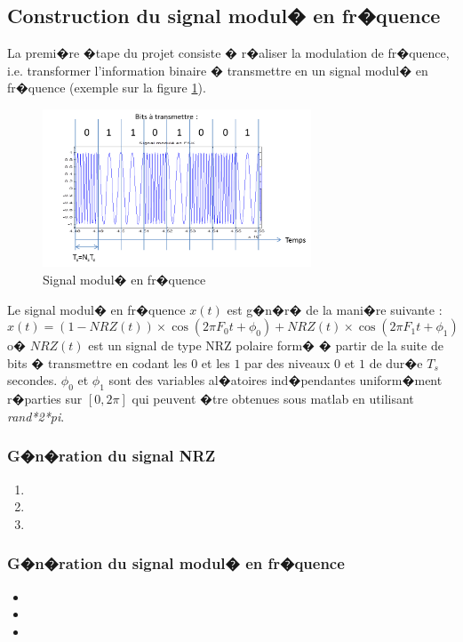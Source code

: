 \documentclass[frenchb]{article}
\begin{document}
    \subsection{Construction du signal modul� en fr�quence} \label{sec:signal}
    La premi�re �tape du projet consiste � r�aliser la modulation de fr�quence, i.e. transformer l'information binaire � transmettre en un signal modul� en fr�quence (exemple sur la figure \ref{fig : signalFSK}).
        \begin{figure}[ht!]
            \centering
            \includegraphics[width=8cm]{SignalFSK.png}
            \caption{Signal modul� en fr�quence \label{fig : signalFSK}}
        \end{figure}
    Le signal modul� en fr�quence $x(t)$ est g�n�r� de la mani�re suivante :
            \begin{equation} \label{signal_mod_freq}
            x(t)=(1-NRZ(t)) \times \cos(2 \pi F_0 t+\phi_0) + NRZ(t) \times \cos(2 \pi F_1 t+\phi_1)
            \end{equation}
    o� $NRZ(t)$ est un signal de type NRZ polaire form� � partir de la suite de bits � transmettre en codant les $0$ et les $1$ par des niveaux $0$ et $1$ de dur�e $T_s$ secondes. $\phi_0$ et $\phi_1$ sont des variables al�atoires ind�pendantes uniform�ment r�parties sur $\left[0, 2 \pi\right]$ qui peuvent �tre obtenues sous matlab en utilisant \emph{rand*2*pi}.

        \subsubsection{G�n�ration du signal NRZ}
            \begin{enumerate}
                \item
                \item
                \item
            \end{enumerate}

        \subsubsection{G�n�ration du signal modul� en fr�quence}
            \begin{itemize}
                \item 
                \item 
                \item 
            \end{itemize}
\end{document}
